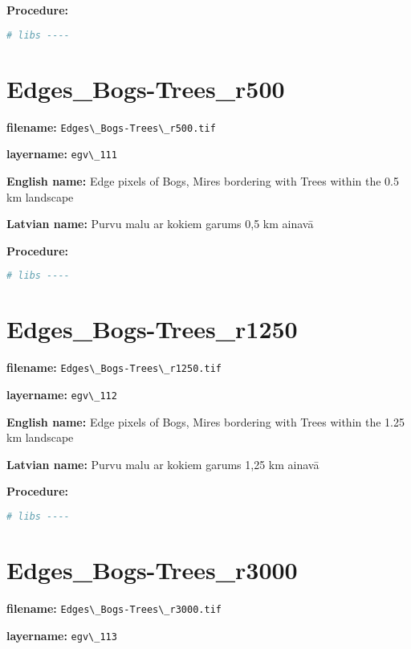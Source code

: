 \documentclass[
]{book}
\newcommand{\passthrough}[1]{#1}
\begin{document}
\textbf{Procedure:}

\begin{lstlisting}[language=R]
# libs ----
\end{lstlisting}

\section{Edges\_Bogs-Trees\_r500}\label{ch06.111}

\textbf{filename:} \passthrough{\lstinline!Edges\_Bogs-Trees\_r500.tif!}

\textbf{layername:} \passthrough{\lstinline!egv\_111!}

\textbf{English name:} Edge pixels of Bogs, Mires bordering with Trees within the 0.5 km landscape

\textbf{Latvian name:} Purvu malu ar kokiem garums 0,5 km ainavā

\textbf{Procedure:}

\begin{lstlisting}[language=R]
# libs ----
\end{lstlisting}

\section{Edges\_Bogs-Trees\_r1250}\label{ch06.112}

\textbf{filename:} \passthrough{\lstinline!Edges\_Bogs-Trees\_r1250.tif!}

\textbf{layername:} \passthrough{\lstinline!egv\_112!}

\textbf{English name:} Edge pixels of Bogs, Mires bordering with Trees within the 1.25 km landscape

\textbf{Latvian name:} Purvu malu ar kokiem garums 1,25 km ainavā

\textbf{Procedure:}

\begin{lstlisting}[language=R]
# libs ----
\end{lstlisting}

\section{Edges\_Bogs-Trees\_r3000}\label{ch06.113}

\textbf{filename:} \passthrough{\lstinline!Edges\_Bogs-Trees\_r3000.tif!}

\textbf{layername:} \passthrough{\lstinline!egv\_113!}
\end{document}
